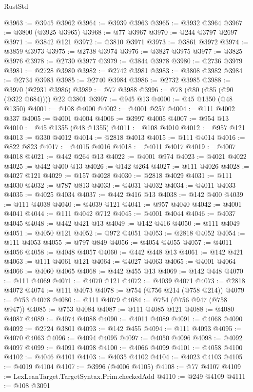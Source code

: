 \begin{lexlean}{RustStd}
\begin{coremodule}
@3963 := @3945 @3962
@3964 := @3939 @3963
@3965 := @3932 @3964
@3967 := @3800 (@3925 @3965)
@3968 := @77 @3967
@3970 := @244 @3797 @2697
@3971 := @3842 @121
@3972 := @3810 @3971
@3973 := @3861 @3972
@3974 := @3859 @3973
@3975 := @2738 @3974
@3976 := @3827 @3975
@3977 := @3825 @3976
@3978 := @2730 @3977
@3979 := @3844 @3978
@3980 := @2736 @3979
@3981 := @2728 @3980
@3982 := @2742 @3981
@3983 := @3808 @3982
@3984 := @2734 @3983
@3985 := @2740 @3984
@3986 := @2732 @3985
@3988 := @3970 (@2931 @3986)
@3989 := @77 @3988
@3996 := @78 (@80 (@85 (@90 (@322 @684)))) @22 @3801
@3997 := @945 @13
@4000 := @45 @1350 (@48 @1350)
@4001 := @108 @4000
@4002 := @4001 @257
@4004 := @111 @4002 @337
@4005 := @4001 @4004
@4006 := @3997 @4005
@4007 := @954 @13
@4010 := @45 @1355 (@48 @1355)
@4011 := @108 @4010
@4012 := @957 @121
@4013 := @330 @4012
@4014 := @2818 @4013
@4015 := @111 @4014
@4016 := @822 @823
@4017 := @4015 @4016
@4018 := @4011 @4017
@4019 := @4007 @4018
@4021 := @442 @264 @13
@4022 := @4001 @974
@4023 := @4021 @4022
@4025 := @442 @400 @13
@4026 := @142 @264
@4027 := @111 @4026
@4028 := @4027 @121
@4029 := @157 @4028
@4030 := @2818 @4029
@4031 := @111 @4030
@4032 := @787 @813
@4033 := @4031 @4032
@4034 := @4011 @4033
@4035 := @4025 @4034
@4037 := @442 @416 @13
@4038 := @142 @400
@4039 := @111 @4038
@4040 := @4039 @121
@4041 := @957 @4040
@4042 := @4001 @4041
@4044 := @111 @4042 @712
@4045 := @4001 @4044
@4046 := @4037 @4045
@4048 := @442 @421 @13
@4049 := @142 @416
@4050 := @111 @4049
@4051 := @4050 @121
@4052 := @972 @4051
@4053 := @2818 @4052
@4054 := @111 @4053
@4055 := @797 @849
@4056 := @4054 @4055
@4057 := @4011 @4056
@4058 := @4048 @4057
@4060 := @442 @448 @13
@4061 := @142 @421
@4063 := @111 @4061 @121
@4064 := @4027 @4063
@4065 := @4001 @4064
@4066 := @4060 @4065
@4068 := @442 @455 @13
@4069 := @142 @448
@4070 := @111 @4069
@4071 := @4070 @121
@4072 := @4039 @4071
@4073 := @2818 @4072
@4074 := @111 @4073
@4078 := @754 (@756 @214 (@758 @214))
@4079 := @753 @4078
@4080 := @111 @4079
@4084 := @754 (@756 @947 (@758 @947))
@4085 := @753 @4084
@4087 := @111 @4085 @121
@4088 := @4080 @4087
@4089 := @4074 @4088
@4090 := @4011 @4089
@4091 := @4068 @4090
@4092 := @2724 @3801
@4093 := @142 @455
@4094 := @111 @4093
@4095 := @4070 @4063
@4096 := @4094 @4095
@4097 := @4050 @4096
@4098 := @4092 @4097
@4099 := @4091 @4098
@4100 := @4066 @4099
@4101 := @4058 @4100
@4102 := @4046 @4101
@4103 := @4035 @4102
@4104 := @4023 @4103
@4105 := @4019 @4104
@4107 := @3996 (@4006 @4105)
@4108 := @77 @4107
@4109 := LexLeanTarget.TargetSyntax.Prim.checkedAdd
@4110 := @249 @4109
@4111 := @108 @3091

\end{coremodule}
\end{lexlean}
